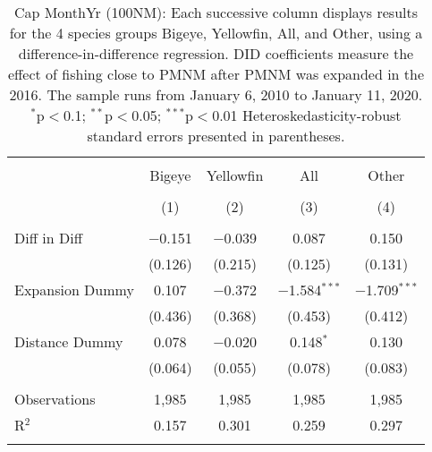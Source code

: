 
\begin{table}[!htbp] \centering 
  \caption{Cap MonthYr (100NM): Each successive column displays results for the 4 species groups Bigeye, Yellowfin, All, and Other, using a difference-in-difference regression. DID coefficients measure the effect of fishing close to PMNM after PMNM was expanded in the 2016. The sample runs from January 6, 2010 to January 11, 2020. $^{*}$p$<$0.1; $^{**}$p$<$0.05; $^{***}$p$<$0.01 Heteroskedasticity-robust standard errors presented in parentheses.} 
  \label{tbl:timeFE100NM} 
\begin{tabular}{@{\extracolsep{5pt}}lcccc} 
\\[-1.8ex]\hline 
\hline \\[-1.8ex] 
 & Bigeye & Yellowfin & All & Other \\ 
\\[-1.8ex] & (1) & (2) & (3) & (4)\\ 
\hline \\[-1.8ex] 
 Diff in Diff & $-$0.151 & $-$0.039 & 0.087 & 0.150 \\ 
  & (0.126) & (0.215) & (0.125) & (0.131) \\ 
  Expansion Dummy & 0.107 & $-$0.372 & $-$1.584$^{***}$ & $-$1.709$^{***}$ \\ 
  & (0.436) & (0.368) & (0.453) & (0.412) \\ 
  Distance Dummy & 0.078 & $-$0.020 & 0.148$^{*}$ & 0.130 \\ 
  & (0.064) & (0.055) & (0.078) & (0.083) \\ 
 \hline \\[-1.8ex] 
Observations & 1,985 & 1,985 & 1,985 & 1,985 \\ 
R$^{2}$ & 0.157 & 0.301 & 0.259 & 0.297 \\ 
\hline 
\hline \\[-1.8ex] 
\end{tabular} 
\end{table} 
